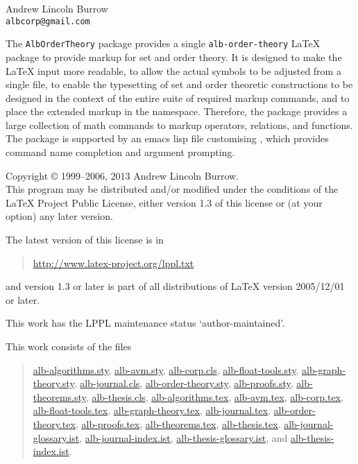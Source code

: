 \documentclass[11pt,a4paper,oneside]{alb-corp}
\begin{document}


\begin{albTitlePage}


  Andrew Lincoln Burrow\\
  \texttt{albcorp@gmail.com}



  The \texttt{AlbOrderTheory} package provides a single
  \texttt{alb-order-theory} \LaTeX{} package to provide markup for set
  and order theory.  It is designed to make the \LaTeX{} input more
  readable, to allow the actual symbols to be adjusted from a single
  file, to enable the typesetting of set and order theoretic
  constructions to be designed in the context of the entire suite of
  required markup commands, and to place the extended markup in the
  \albLogo{} namespace.  Therefore, the package provides a large
  collection of math commands to markup operators, relations, and
  functions.  The package is supported by an emacs lisp file customising
  \AUCTeX{}, which provides command name completion and argument
  prompting.



  Copyright \copyright{} 1999--2006, 2013 Andrew Lincoln Burrow.\\
  This program may be distributed and/or modified under the conditions
  of the \LaTeX{} Project Public License, either version 1.3 of this
  license or (at your option) any later version.

  \medskip{}

  The latest version of this license is in
  \begin{quote}
    \url{http://www.latex-project.org/lppl.txt}
  \end{quote}
  and version 1.3 or later is part of all distributions of LaTeX version
  2005/12/01 or later.

  \medskip{}

  This work has the LPPL maintenance status `author-maintained'.

  \medskip{}

  This work consists of the files
  \begin{quote}
    \begin{flushleft}
      \url{alb-algorithms.sty}, \url{alb-avm.sty}, \url{alb-corp.cls},
      \url{alb-float-tools.sty}, \url{alb-graph-theory.sty},
      \url{alb-journal.cls}, \url{alb-order-theory.sty},
      \url{alb-proofs.sty}, \url{alb-theorems.sty},
      \url{alb-thesis.cls}, \url{alb-algorithms.tex}, \url{alb-avm.tex},
      \url{alb-corp.tex}, \url{alb-float-tools.tex},
      \url{alb-graph-theory.tex}, \url{alb-journal.tex},
      \url{alb-order-theory.tex}, \url{alb-proofs.tex},
      \url{alb-theorems.tex}, \url{alb-thesis.tex}.
      \url{alb-journal-glossary.ist}, \url{alb-journal-index.ist},
      \url{alb-thesis-glossary.ist}, and \url{alb-thesis-index.ist}.
    \end{flushleft}
  \end{quote}



\end{albTitlePage}
\end{document}
